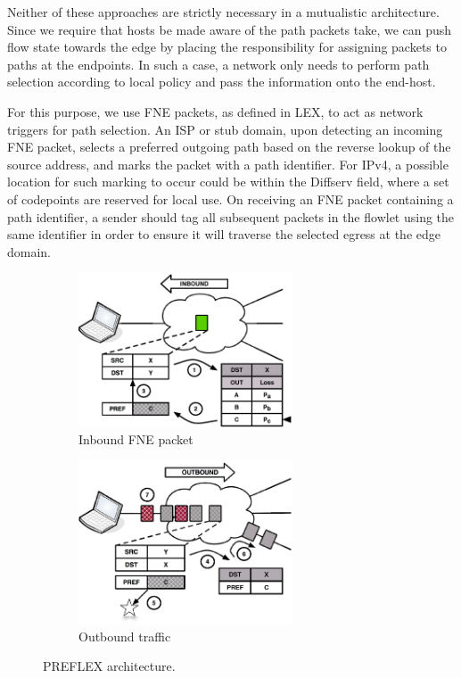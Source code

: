 Neither of these approaches are strictly necessary in a mutualistic architecture. Since we require that hosts be made aware of the path packets take, we can push flow state towards the edge by placing the responsibility for assigning packets to paths at the endpoints.  In such a case, a network only needs to perform path selection according to local policy and pass the information onto the end-host.

For this purpose, we use \ac{FNE} packets, as defined in \ac{LEX}, to act as network triggers for path selection. An \ac{ISP} or stub domain, upon detecting an incoming \ac{FNE} packet, selects a preferred outgoing path based on the reverse lookup of the source address, and marks the packet with a path identifier. For \ac{IP}v4, a possible location for such marking to occur could be within the Diffserv field, where a set of codepoints are reserved for local use. On receiving an \ac{FNE} packet containing a path identifier, a sender should tag all subsequent packets in the flowlet using the same identifier in order to ensure it will traverse the selected egress at the edge domain.

\begin{figure}
        \begin{subfigure}[b]{0.5\textwidth}
                \centering
                \includegraphics[width=2.5in]{figures/preflex/preflex1}
                \caption{Inbound FNE packet}
                \label{fig:preflexin}
        \end{subfigure}%
        \begin{subfigure}[b]{0.5\textwidth}
                \centering
                \includegraphics[width=2.5in]{figures/preflex/preflex2}
                \caption{Outbound traffic}
                \label{fig:preflexout}
        \end{subfigure}
        \caption{PREFLEX architecture.}
        \label{fig:preflex}
\end{figure}

